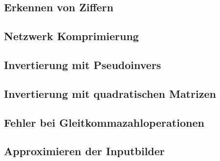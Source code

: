 \documentclass[Interploate_hadwritten_Digits.tex]{subfiles}
\begin{document}
	\subsection{Erkennen von Ziffern}
	
	\subsection{Netzwerk Komprimierung}
	\label{sec:results_compression}
	
	\subsection{Invertierung mit Pseudoinvers}
	
	\subsection{Invertierung mit quadratischen Matrizen}
	
	\subsection{Fehler bei Gleitkommazahloperationen}
	
	\subsection{Approximieren der Inputbilder}
	
	
\end{document}
